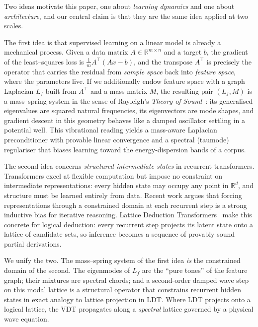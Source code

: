 \documentclass[12pt,a4paper]{article}
\theoremstyle{plain}
\theoremstyle{definition}
\theoremstyle{remark}
\newcommand{\R}{\mathbb{R}}
\newcommand{\1}{\mathbf{1}}
\newcommand{\VDT}{\textsc{VDT}}
\begin{document}
Two ideas motivate this paper, one about \emph{learning dynamics} and
one about \emph{architecture}, and our central claim is that they are
the same idea applied at two scales.

The first idea is that supervised learning on a linear model is already
a mechanical process. Given a data matrix $A \in \R^{m\times n}$ and a
target $b$, the gradient of the least--squares loss is
$\frac{1}{m} A^\top(Ax-b)$, and the transpose $A^\top$ is precisely the
operator that carries the residual from \emph{sample space} back into
\emph{feature space}, where the parameters live. If we additionally
endow feature space with a graph Laplacian $L_f$ built from $A^\top$ and
a mass matrix $M$, the resulting pair $(L_f, M)$ is a mass--spring
system in the sense of Rayleigh's \emph{Theory of
Sound}~\cite{rayleigh_theory_sound_1}: its generalised eigenvalues are
squared natural frequencies, its eigenvectors are mode shapes, and
gradient descent in this geometry behaves like a damped oscillator
settling in a potential well. This vibrational reading yields a
mass-aware Laplacian preconditioner with provable linear convergence and
a spectral (taumode) regulariser that biases learning toward the
energy-dispersion bands of a corpus.

The second idea concerns \emph{structured intermediate states} in
recurrent transformers. Transformers excel at flexible computation but
impose no constraint on intermediate representations: every hidden state
may occupy any point in $\R^d$, and structure must be learned entirely
from data. Recent work argues that forcing representations through a
constrained domain at each recurrent step is a strong inductive bias for
iterative reasoning. Lattice Deduction Transformers~\cite{davis2026ldt}
make this concrete for logical deduction: every recurrent step projects
its latent state onto a lattice of candidate sets, so inference becomes
a sequence of provably sound partial derivations.

We unify the two. The mass--spring system of the first idea \emph{is}
the constrained domain of the second. The eigenmodes of $L_f$ are the
``pure tones'' of the feature graph; their mixtures are spectral chords;
and a second-order damped wave step on this modal lattice is a structural
operator that constrains recurrent hidden states in exact analogy to
lattice projection in \textsc{LDT}. Where \textsc{LDT} projects onto a
logical lattice, the \VDT{} propagates along a \emph{spectral} lattice
governed by a physical wave equation.
\end{document}
